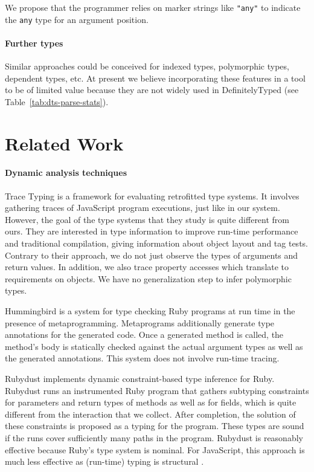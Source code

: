 \documentclass[sigplan,screen]{acmart}
\begin{document}
We propose that the programmer relies on marker strings like \lstinline/"any"/ to indicate
the \lstinline/any/ type for an argument position.

\paragraph*{Further types}
Similar approaches could be conceived for indexed types, polymorphic types, dependent
types, etc. At present we believe incorporating these
features in a tool to be of limited value because they are not widely used in DefinitelyTyped (see
Table~\ref{tab:dts-parse-stats}). 

\section{Related Work}
\label{sec:related-work}
\paragraph*{Dynamic analysis techniques} Trace Typing
\cite{DBLP:conf/ecoop/AndreasenGCSTS16} is a framework for evaluating
retrofitted type systems. It involves gathering traces of JavaScript program
executions, just like in our system. However, the goal of the type
systems that they study is quite different from ours. They are
interested in type information to improve run-time performance and
traditional compilation, giving information about object layout and
tag tests. Contrary to their approach, we do not just observe the
types of arguments and return values. In addition, we also trace
property accesses which translate to requirements on objects. We
have no generalization step to infer polymorphic types.

Hummingbird \cite{DBLP:conf/pldi/RenF16} is a system for type checking
Ruby programs at run time in the presence of
metaprogramming. Metaprograms additionally generate
type annotations for the generated code. Once a generated method is
called, the method's body is statically checked against the actual
argument types as well as the generated annotations. This system does
not involve run-time tracing.

Rubydust \cite{DBLP:conf/popl/AnCFH11} implements dynamic
constraint-based type inference for Ruby. Rubydust runs an
instrumented Ruby program that gathers subtyping constraints for
parameters and return types of methods as well as for fields, which is
quite different from the interaction that we collect. After
completion, the solution of these constraints is proposed as a typing
for the program. These types are sound if the runs cover sufficiently
many paths in the program. Rubydust is reasonably effective because
Ruby's type system is nominal. For JavaScript, this approach is much
less effective as (run-time) typing is structural
\cite{DBLP:conf/sfp/NausT16}.
\end{document}
